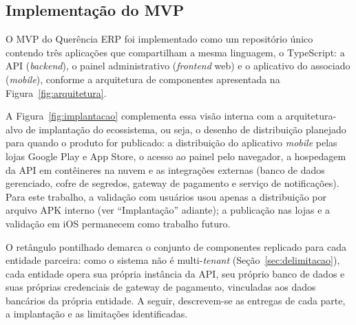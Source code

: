 \documentclass[12pt,a4paper]{article}
\begin{document}
\subsection{Implementação do MVP}
\label{sec:implementacao-mvp}

O MVP do Querência ERP foi implementado como um repositório único contendo três aplicações que
compartilham a mesma linguagem, o TypeScript: a API (\textit{backend}), o painel administrativo
(\textit{frontend} web) e o aplicativo do associado (\textit{mobile}), conforme a arquitetura de
componentes apresentada na Figura~\ref{fig:arquitetura}.

A Figura~\ref{fig:implantacao} complementa
essa visão interna com a arquitetura-alvo de implantação do ecossistema, ou seja, o desenho de
distribuição planejado para quando o produto for publicado: a distribuição do aplicativo
\textit{mobile} pelas lojas Google Play e App Store, o acesso ao painel pelo navegador, a hospedagem
da API em contêineres na nuvem e as integrações externas (banco de dados gerenciado, cofre de
segredos, gateway de pagamento e serviço de notificações). Para este trabalho, a validação com
usuários usou apenas a distribuição por arquivo APK interno (ver ``Implantação'' adiante); a
publicação nas lojas e a validação em iOS permanecem como trabalho futuro.

O retângulo pontilhado
demarca o conjunto de componentes replicado para cada entidade parceira: como o sistema não é
multi-\textit{tenant} (Seção~\ref{sec:delimitacao}), cada entidade opera sua própria instância da
API, seu próprio banco de dados e suas próprias credenciais de gateway de pagamento, vinculadas aos
dados bancários da própria entidade. A seguir, descrevem-se as entregas de cada parte, a implantação
e as limitações identificadas.
\end{document}
